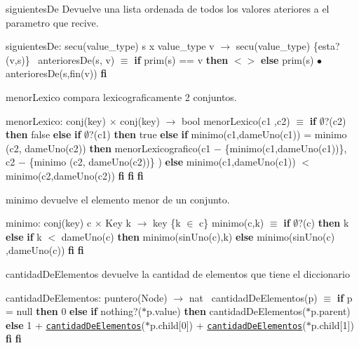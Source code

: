 \begin{DoxyParagraph}{siguientes\+De}
Devuelve una lista ordenada de todos los valores ateriores a el parametro que recive.

siguientes\+De\+: secu(value\+\_\+type) s x value\+\_\+type v $\to$ secu(value\+\_\+type) \{esta?(v,s)\}~\newline
 anteriores\+De(s, v) $\equiv$ {\bfseries if} prim(s) == v {\bfseries then} $<$$>$ {\bfseries else} prim(s) $\bullet$ anteriores\+De(s,fin(v)) {\bfseries fi} 
\end{DoxyParagraph}


\begin{DoxyParagraph}{menor\+Lexico}
compara lexicograficamente 2 conjuntos.

menor\+Lexico\+: conj(key) $\times$ conj(key) $\to$ bool menor\+Lexico(c1 ,c2) $\equiv$ {\bfseries if} $\emptyset$?(c2) {\bfseries then} false {\bfseries else} {\bfseries if} $\emptyset$?(c1) {\bfseries then} true {\bfseries else} {\bfseries if} minimo(c1,dame\+Uno(c1)) = minimo (c2, dame\+Uno(c2)) {\bfseries then} menor\+Lexicografico(c1 $-$ \{minimo(c1,dame\+Uno(c1))\}, c2 $-$ \{minimo (c2, dame\+Uno(c2))\} ) {\bfseries else} minimo(c1,dame\+Uno(c1)) $<$ minimo(c2,dame\+Uno(c2)) {\bfseries fi} {\bfseries fi} {\bfseries fi} 
\end{DoxyParagraph}


\begin{DoxyParagraph}{minimo}
devuelve el elemento menor de un conjunto.

minimo\+: conj(key) c $\times$ Key k $\to$ key \{k $\in$ c\} minimo(c,k) $\equiv$ {\bfseries if} $\emptyset$?(c) {\bfseries then} k {\bfseries else} {\bfseries if} k $<$ dame\+Uno(c) {\bfseries then} minimo(sin\+Uno(c),k) {\bfseries else} minimo(sin\+Uno(c) ,dame\+Uno(c)) {\bfseries fi} {\bfseries fi} 
\end{DoxyParagraph}


\begin{DoxyParagraph}{cantidad\+De\+Elementos}
devuelve la cantidad de elementos que tiene el diccionario

cantidad\+De\+Elementos\+: puntero(\+Node) $\to$ nat~\newline
 cantidad\+De\+Elementos(p) $\equiv$ {\bfseries if} p = null {\bfseries then} 0 {\bfseries else} {\bfseries if} nothing?($\ast$p.value) {\bfseries then} cantidad\+De\+Elementos($\ast$p.parent) ~\newline
 {\bfseries else} 1 + \href{axiomas.html#cantidadDeElementos}{\tt cantidad\+De\+Elementos}($\ast$p.child\mbox{[}0\mbox{]}) + \href{axiomas.html#cantidadDeElementos}{\tt cantidad\+De\+Elementos}($\ast$p.child\mbox{[}1\mbox{]}) {\bfseries fi} {\bfseries fi} 
\end{DoxyParagraph}


